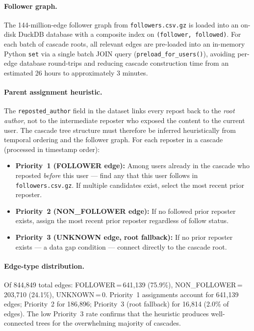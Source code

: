 \documentclass[12pt, a4paper]{article}
\begin{document}
\paragraph{Follower graph.} The 144-million-edge follower graph from \texttt{followers.csv.gz} is loaded into an on-disk DuckDB database with a composite index on \texttt{(follower, followed)}. For each batch of cascade roots, all relevant edges are pre-loaded into an in-memory Python \texttt{set} via a single batch JOIN query (\texttt{preload\_for\_users()}), avoiding per-edge database round-trips and reducing cascade construction time from an estimated 26 hours to approximately 3 minutes.

\paragraph{Parent assignment heuristic.} The \texttt{reposted\_author} field in the dataset links every repost back to the \textit{root author}, not to the intermediate reposter who exposed the content to the current user. The cascade tree structure must therefore be inferred heuristically from temporal ordering and the follower graph. For each reposter in a cascade (processed in timestamp order):

\begin{itemize}
  \item \textbf{Priority~1 (FOLLOWER edge):} Among users already in the cascade who reposted \textit{before} this user --- find any that this user follows in \texttt{followers.csv.gz}. If multiple candidates exist, select the most recent prior reposter.
  \item \textbf{Priority~2 (NON\_FOLLOWER edge):} If no followed prior reposter exists, assign the most recent prior reposter regardless of follow status.
  \item \textbf{Priority~3 (UNKNOWN edge, root fallback):} If no prior reposter exists --- a data gap condition --- connect directly to the cascade root.
\end{itemize}

\paragraph{Edge-type distribution.} Of 844,849 total edges: FOLLOWER\,=\,641,139 (75.9\%), NON\_FOLLOWER\,=\,203,710 (24.1\%), UNKNOWN\,=\,0. Priority~1 assignments account for 641,139 edges; Priority~2 for 186,896; Priority~3 (root fallback) for 16,814 (2.0\% of edges). The low Priority~3 rate confirms that the heuristic produces well-connected trees for the overwhelming majority of cascades.
\end{document}
